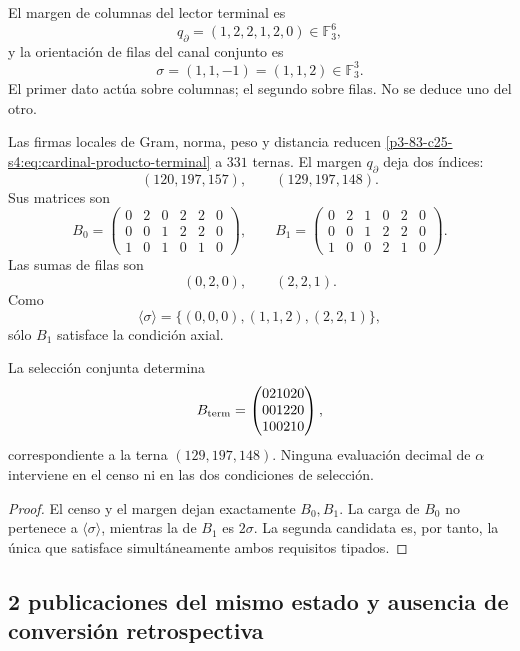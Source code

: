 El margen de columnas del lector terminal es
\[
 q_\partial=(1,2,2,1,2,0)\in\mathbb F_3^6,
\]
y la orientación de filas del canal conjunto es
\[
 \sigma=(1,1,-1)=(1,1,2)\in\mathbb F_3^3.
\]
El primer dato actúa sobre columnas; el segundo sobre filas. No se deduce
uno del otro.

Las firmas locales de Gram, norma, peso y distancia reducen
\eqref{p3-83-c25-s4:eq:cardinal-producto-terminal} a \(331\) ternas. El margen
\(q_\partial\) deja dos índices:
\[
 (120,197,157),
 \qquad
 (129,197,148).
\]
Sus matrices son
\[
 B_0=
 \begin{pmatrix}
 0&2&0&2&2&0\\
 0&0&1&2&2&0\\
 1&0&1&0&1&0
 \end{pmatrix},
 \qquad
 B_1=
 \begin{pmatrix}
 0&2&1&0&2&0\\
 0&0&1&2&2&0\\
 1&0&0&2&1&0
 \end{pmatrix}.
\]
Las sumas de filas son
\[
 (0,2,0),
 \qquad
 (2,2,1).
\]
Como
\[
 \langle\sigma\rangle
 =\{(0,0,0),(1,1,2),(2,2,1)\},
\]
sólo \(B_1\) satisface la condición axial.

\begin{theorem}
\label{p3-83-c25-s4:thm:unicidad-publicacion-terminal-visible}
La selección conjunta determina
\begin{equation}
 B_{\rm term}=
 \begin{pmatrix}
 021020\\001220\\100210
 \end{pmatrix},
 \label{p3-83-c25-s4:eq:matriz-terminal-visible}
\end{equation}
correspondiente a la terna \((129,197,148)\). Ninguna evaluación decimal de
\(\alpha\) interviene en el censo ni en las dos condiciones de selección.
\end{theorem}

\begin{proof}
El censo y el margen dejan exactamente \(B_0,B_1\). La carga de \(B_0\)
no pertenece a \(\langle\sigma\rangle\), mientras la de \(B_1\) es
\(2\sigma\). La segunda candidata es, por tanto, la única que satisface
simultáneamente ambos requisitos tipados.
\end{proof}

\subsection{2 publicaciones del mismo estado y ausencia de conversión retrospectiva}

